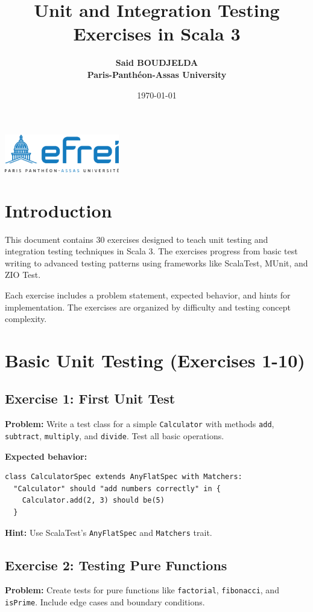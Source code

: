 \documentclass[12pt,a4paper]{article}
\title{\textbf{Unit and Integration Testing Exercises in Scala 3}}
\author{\textbf{Said BOUDJELDA}\\ \textbf{Paris-Panthéon-Assas University}}
\date{\today}
\begin{document}
\maketitle

\begin{center}
  \includegraphics[width=5cm]{logo}
\end{center}

\tableofcontents
\newpage

\section{Introduction}

This document contains 30 exercises designed to teach unit testing and integration testing techniques in Scala 3. The exercises progress from basic test writing to advanced testing patterns using frameworks like ScalaTest, MUnit, and ZIO Test.

Each exercise includes a problem statement, expected behavior, and hints for implementation. The exercises are organized by difficulty and testing concept complexity.

\section{Basic Unit Testing (Exercises 1-10)}

\subsection{Exercise 1: First Unit Test}
\textbf{Problem:} Write a test class for a simple \texttt{Calculator} with methods \texttt{add}, \texttt{subtract}, \texttt{multiply}, and \texttt{divide}. Test all basic operations.

\textbf{Expected behavior:}
\begin{lstlisting}
class CalculatorSpec extends AnyFlatSpec with Matchers:
  "Calculator" should "add numbers correctly" in {
    Calculator.add(2, 3) should be(5)
  }
\end{lstlisting}

\textbf{Hint:} Use ScalaTest's \texttt{AnyFlatSpec} and \texttt{Matchers} trait.

\subsection{Exercise 2: Testing Pure Functions}
\textbf{Problem:} Create tests for pure functions like \texttt{factorial}, \texttt{fibonacci}, and \texttt{isPrime}. Include edge cases and boundary conditions.
\end{document}
